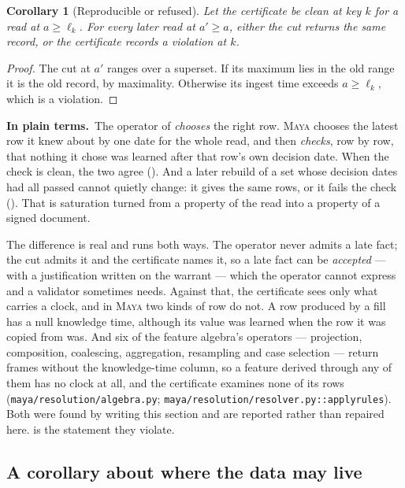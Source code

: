 \documentclass[11pt,a4paper]{article}
\renewcommand{\_}{\oldunderscore\allowbreak}
\theoremstyle{plain}
\newtheorem{corollary}[theorem]{Corollary}
\theoremstyle{definition}
\theoremstyle{definition}
\theoremstyle{remark}
\newcommand{\pt}{\textbf{In plain terms.}\ }
\begin{document}
\begin{corollary}[Reproducible or refused]\label{cor:reproorrefused}
Let the certificate be clean at key $k$ for a read at $a \ge \ell_k$. For every later read at
$a' \ge a$, either the cut returns the same record, or the certificate records a violation at $k$.
\end{corollary}

\begin{proof}
The cut at $a'$ ranges over a superset. If its maximum lies in the old range it is the old record, by
maximality. Otherwise its ingest time exceeds $a \ge \ell_k$, which is a violation.
\end{proof}

\begin{plain}
\pt The operator of  \emph{chooses} the right row. \textsc{Maya} chooses the latest row it
knew about by one date for the whole read, and then \emph{checks}, row by row, that nothing it chose was
learned after that row's own decision date. When the check is clean, the two agree
(). And a later rebuild of a set whose decision dates had all passed cannot quietly
change: it gives the same rows, or it fails the check (). That is saturation
turned from a property of the read into a property of a signed document.
\end{plain}

The difference is real and runs both ways. The operator never admits a late fact; the cut admits it and
the certificate names it, so a late fact can be \emph{accepted} --- with a justification written on the
warrant --- which the operator cannot express and a validator sometimes needs. Against that, the
certificate sees only what carries a clock, and in \textsc{Maya} two kinds of row do not. A row
produced by a fill has a null knowledge time, although its value was learned when the row it was copied
from was. And six of the feature algebra's operators --- projection, composition, coalescing,
aggregation, resampling and case selection --- return frames without the knowledge-time column, so a feature derived through any of
them has no clock at all, and the certificate examines none of its rows
(\texttt{maya/resolution/algebra.py}; \texttt{maya/resolution/resolver.py::apply\_rules}). Both were found
by writing this section and are reported rather than repaired here.  is the statement
they violate.

\subsection{A corollary about where the data may live}\label{sec:pull}
\end{document}
